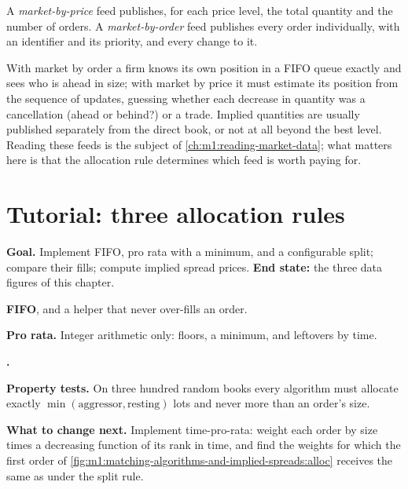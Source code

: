 \begin{definition}\label{def:m1:matching-algorithms-and-implied-spreads:mbo}
A \emph{market-by-price} feed publishes, for each
price level, the total quantity and the number of orders. A
\emph{market-by-order} feed publishes every order
individually, with an identifier and its priority, and every change to it.
\end{definition}

With market by order a firm knows its own position in a FIFO queue exactly
and sees who is ahead in size; with market by price it must estimate its
position from the sequence of updates, guessing whether each decrease in
quantity was a cancellation (ahead or behind?) or a trade. Implied
quantities are usually published separately from the direct book, or not at
all beyond the best level. Reading these feeds is the subject of
\cref{ch:m1:reading-market-data}; what matters here is that the allocation
rule determines which feed is worth paying for.

\section{Tutorial: three allocation rules}\label{tut:m1:matching-algorithms-and-implied-spreads:alloc}

\begin{tutorial}
\textbf{Goal.} Implement FIFO, pro rata with a minimum, and a configurable
split; compare their fills; compute implied spread prices. \textbf{End
state:} the three data figures of this chapter.
\begin{tutsteps}
\item \textbf{FIFO}, and a helper that never over-fills an order.
\label{lst:m1:matching-algorithms-and-implied-spreads:fifo}
\item \textbf{Pro rata.} Integer arithmetic only: floors, a minimum, and
leftovers by time.
\label{lst:m1:matching-algorithms-and-implied-spreads:prorata}
\item \textbf{.}
\label{lst:m1:matching-algorithms-and-implied-spreads:implied}
\item \textbf{Property tests.} On three hundred random books every algorithm
must allocate exactly $\min(\text{aggressor}, \text{resting})$ lots and never
more than an order's size.
\end{tutsteps}
\textbf{What to change next.} Implement time-pro-rata: weight each order by
size times a decreasing function of its rank in time, and find the weights
for which the first order of \cref{fig:m1:matching-algorithms-and-implied-spreads:alloc}
receives the same as under the split rule.
\end{tutorial}

